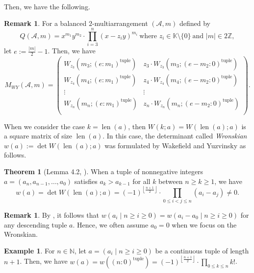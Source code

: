 \documentclass[12pt]{amsart}
\theoremstyle{definition}
\newtheorem{theorem}[definition]{Theorem}
\newtheorem{remark}[definition]{Remark}
\newtheorem{example}[definition]{Example}
\newcommand{\NN}{\mathbb{N}}
\newcommand{\ZZ}{\mathbb{Z}}
\newcommand{\KK}{\mathbb{K}}
\newcommand{\AAA}{\mathcal{A}}
\newcommand{\tuple}[1]{({#1}:0)^{\text{tuple}}}
\newcommand{\length}[1]{\operatorname{len}(#1)}
\begin{document}
Then, we have the following. 
\begin{remark}\label{remark:WY-matrix_2} %
For a balanced $2$-multiarrangement $(\AAA,m)$ defined by 
$$Q(\AAA,m)=x^{m_1}y^{m_2}\cdot\prod_{i=3}^{n}(x-z_iy)^{m_i}\ \text{where } z_i\in\KK\setminus\{0\}\ \text{and } |m|\in2\ZZ,$$
let $e:=\frac{|m|}{2}-1$. Then, we have 
\[
M_{WY}(\AAA,m)=
\left(
\begin{array}{c|c}
 W_{z_3}(m_3;(e:m_1)^{\text{tuple}}) & z_3\cdot W_{z_3}(m_3;(e-m_2:0)^{\text{tuple}}) \\
\hline%
 W_{z_4}(m_4;(e:m_1)^{\text{tuple}}) & z_4\cdot W_{z_4}(m_4;(e-m_2:0)^{\text{tuple}}) \\
 \hline%
 \vdots & \vdots \\
 \hline%
 W_{z_n}(m_n;(e:m_1)^{\text{tuple}}) & z_n\cdot W_{z_n}(m_n;(e-m_2:0)^{\text{tuple}}) \\
\end{array}
\right).
\]
\end{remark}

When we consider the case $k=\length{a}$, then 
$W(k;a)=W(\length{a};a)$ is a square matrix of size $\length{a}$. 
In this case, the determinant called \emph{Wronskian} 
$w(a):= \det W(\length{a};a)$ 
was formulated by Wakefield and Yuzvinsky as follows. 
\begin{theorem}[Lemma 4.2, \cite{Wakefield-Yuzvinsky}]\label{theorem:Wronskian}
    When a tuple of nonnegative integers $a=(a_n,a_{n-1},\ldots,a_0)$ satisfies $a_{k}>a_{k-1}$ for all $k$ between $n \geq k \geq 1$, we have 
    $$w(a)= \det W(\length{a};a)=(-1)^{\left\lfloor\frac{n+1}{2}\right\rfloor}\cdot\prod_{0 \leq i < j \leq n}(a_i-a_j)\neq0.$$
\end{theorem}

\begin{remark}
    By , it follows that 
    $w(a_i\mid n \geq i \geq 0 )=w(a_i - a_0\mid n \geq i \geq 0 )$ 
    for any descending tuple $a$. 
    Hence, we often assume $a_0=0$ when we focus on the Wronskian.     
\end{remark}
\begin{example}
    For $n\in\NN$, let $a=(a_i\mid n \geq i \geq 0)$ be a continuous tuple of length $n+1$. Then, we have $w(a)=w(\tuple{n})
    =(-1)^{\left\lfloor\frac{n+1}{2}\right\rfloor}\cdot\prod_{0 \leq k \leq n}k!$. 
\end{example}
\end{document}
